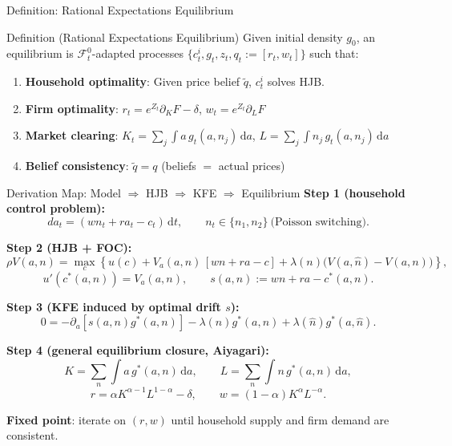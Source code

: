 \documentclass[aspectratio=169,11pt]{beamer}
\newcommand{\emphc}[1]{\textcolor{harvardcrimson}{#1}}
\newcommand{\ud}{\,\mathrm{d}}
\begin{document}
\begin{frame}{Definition: Rational Expectations Equilibrium}
\small
\begin{block}{Definition (Rational Expectations Equilibrium)}
\small
Given initial density $g_0$, an \emphc{equilibrium} is $\mathcal{F}_t^0$-adapted processes $\{c_t^i, g_t, z_t, q_t := [r_t, w_t]\}$ such that:

\begin{enumerate}\itemsep1pt
    \item \textbf{Household optimality}: Given price belief $\tilde{q}$, $c_t^i$ solves HJB.
    \item \textbf{Firm optimality}: $r_t = e^{Z_t}\partial_K F - \delta$, \; $w_t = e^{Z_t}\partial_L F$
    \item \textbf{Market clearing}:
    $K_t = \sum_{j} \int a\,g_t(a,n_j)\ud a$, \; $L = \sum_{j} \int n_j\,g_t(a,n_j)\ud a$
    \item \textbf{Belief consistency}: $\tilde{q} = q$ \quad (beliefs $=$ actual prices)
\end{enumerate}
\end{block}
\end{frame}

\begin{frame}{Derivation Map: Model $\Rightarrow$ HJB $\Rightarrow$ KFE $\Rightarrow$ Equilibrium}
\footnotesize
\textbf{Step 1 (household control problem):}
\[
da_t=(w n_t+r a_t-c_t)\ud t,\qquad n_t\in\{n_1,n_2\}\ \text{(Poisson switching)}.
\]

\vspace{-0.2em}
\textbf{Step 2 (HJB + FOC):}
\[
\rho V(a,n)=\max_c\left\{u(c)+V_a(a,n)\,[w n+r a-c]+\lambda(n)\big(V(a,\hat n)-V(a,n)\big)\right\},
\]
\[
u'(c^*(a,n))=V_a(a,n),\qquad s(a,n):=w n+r a-c^*(a,n).
\]

\vspace{-0.2em}
\textbf{Step 3 (KFE induced by optimal drift $s$):}
\[
0=-\partial_a[s(a,n)g^*(a,n)]-\lambda(n)g^*(a,n)+\lambda(\hat n)g^*(a,\hat n).
\]

\vspace{-0.2em}
\textbf{Step 4 (general equilibrium closure, Aiyagari):}
\[
K=\sum_n\int a\,g^*(a,n)\ud a,\qquad L=\sum_n\int n\,g^*(a,n)\ud a,
\]
\[
r=\alpha K^{\alpha-1}L^{1-\alpha}-\delta,\qquad w=(1-\alpha)K^\alpha L^{-\alpha}.
\]

\vspace{0.1em}
\textbf{Fixed point}: iterate on $(r,w)$ until household supply and firm demand are consistent.
\end{frame}
\end{document}
